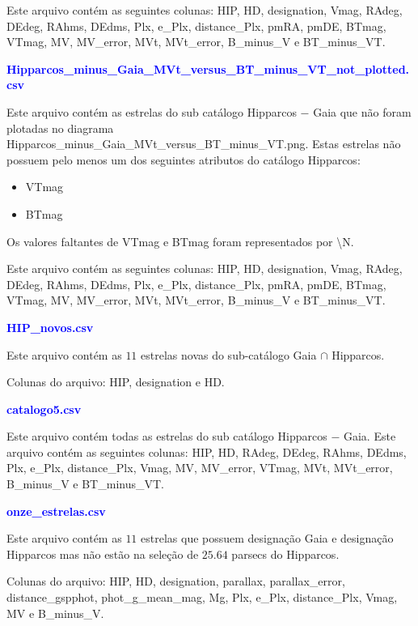 \documentclass{article}
\begin{document}
	Este arquivo contém as seguintes colunas:
	HIP, HD, designation, Vmag, RAdeg, DEdeg, RAhms, DEdms, Plx, e\_Plx, distance\_Plx, pmRA, pmDE, BTmag, VTmag, MV, MV\_error, MVt, MVt\_error, B\_minus\_V e BT\_minus\_VT.
	
	\newpage
	
	\textcolor{blue}{\textbf{Hipparcos\_minus\_Gaia\_MVt\_versus\_BT\_minus\_VT\_not\_plotted.csv}}
	
	\vspace{10pt}
	
	Este arquivo contém as estrelas do sub catálogo Hipparcos $-$ Gaia que não foram plotadas no diagrama Hipparcos\_minus\_Gaia\_MVt\_versus\_BT\_minus\_VT.png.
	Estas estrelas não possuem pelo menos um dos seguintes atributos do catálogo Hipparcos: 
	
	\begin{itemize}
		\item VTmag
		\item BTmag
	\end{itemize}

	Os valores faltantes de VTmag e BTmag foram representados por \textbackslash N.
	
	Este arquivo contém as seguintes colunas:
	HIP, HD, designation, Vmag, RAdeg, DEdeg, RAhms, DEdms, Plx, e\_Plx, distance\_Plx, pmRA, pmDE, BTmag, VTmag, MV, MV\_error, MVt, MVt\_error, B\_minus\_V e BT\_minus\_VT.
			
	\vspace{10pt}

	\textcolor{blue}{\textbf{HIP\_novos.csv}}
	
	\vspace{10pt}
	
	Este arquivo contém as $11$ estrelas novas do sub-catálogo  Gaia $\cap$ Hipparcos. 
	
	Colunas do arquivo:
	HIP, designation e HD.
	
	\vspace{10pt}
	
	\textcolor{blue}{\textbf{catalogo5.csv}}
	
	\vspace{10pt}
	
	Este arquivo contém todas as estrelas do sub catálogo Hipparcos $-$ Gaia.
	Este arquivo contém as seguintes colunas:
	HIP, HD, RAdeg, DEdeg, RAhms, DEdms, Plx, e\_Plx, distance\_Plx, Vmag, MV, MV\_error, VTmag, MVt, MVt\_error, B\_minus\_V e BT\_minus\_VT.

	\vspace{10pt}

	\textcolor{blue}{\textbf{onze\_estrelas.csv}}
	
	\vspace{10pt}
	
	Este arquivo contém as $11$ estrelas  que possuem designação Gaia e designação Hipparcos mas não estão na seleção de $25.64$ parsecs do Hipparcos.
	
	Colunas do arquivo:
	HIP, HD, designation, parallax, parallax\_error, distance\_gspphot, phot\_g\_mean\_mag, Mg, Plx, e\_Plx, distance\_Plx, Vmag, MV e B\_minus\_V.
\end{document}
